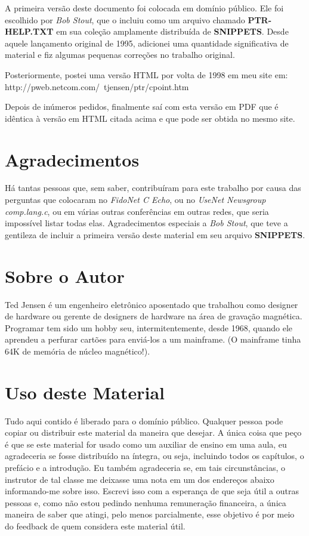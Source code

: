 A primeira versão deste documento foi colocada em domínio público. Ele foi escolhido por \textit{Bob Stout}, que o incluiu como um arquivo chamado \textbf{PTR-HELP.TXT} em sua coleção amplamente distribuída de \textbf{SNIPPETS}. Desde aquele lançamento original de 1995, adicionei uma quantidade significativa de material e fiz algumas pequenas correções no trabalho original.

Posteriormente, postei uma versão HTML por volta de 1998 em meu site em:\\
http://pweb.netcom.com/~tjensen/ptr/cpoint.htm

Depois de inúmeros pedidos, finalmente saí com esta versão em PDF que é idêntica à versão em HTML citada acima e que pode ser obtida no mesmo site.

\section*{Agradecimentos}
Há tantas pessoas que, sem saber, contribuíram para este trabalho por causa das perguntas que colocaram no \textit{FidoNet C Echo}, ou no \textit{UseNet Newsgroup comp.lang.c}, ou em várias outras conferências em outras redes, que seria impossível listar todas elas. Agradecimentos especiais a \textit{Bob Stout}, que teve a gentileza de incluir a primeira versão deste material em seu arquivo \textbf{SNIPPETS}.

\section*{Sobre o Autor}
Ted Jensen é um engenheiro eletrônico aposentado que trabalhou como designer de hardware ou gerente de designers de hardware na área de gravação magnética. Programar tem sido um hobby seu, intermitentemente, desde 1968, quando ele aprendeu a perfurar cartões para enviá-los a um mainframe. (O mainframe tinha 64K de memória de núcleo magnético!).

\section*{Uso deste Material}
Tudo aqui contido é liberado para o domínio público. Qualquer pessoa pode copiar ou distribuir este material da maneira que desejar. A única coisa que peço é que se este material for usado como um auxiliar de ensino em uma aula, eu agradeceria se fosse distribuído na íntegra, ou seja, incluindo todos os capítulos, o prefácio e a introdução. Eu também agradeceria se, em tais circunstâncias, o instrutor de tal classe me deixasse uma nota em um dos endereços abaixo informando-me sobre isso. Escrevi isso com a esperança de que seja útil a outras pessoas e, como não estou pedindo nenhuma remuneração financeira, a única maneira de saber que atingi, pelo menos parcialmente, esse objetivo é por meio do feedback de quem considera este material útil.

